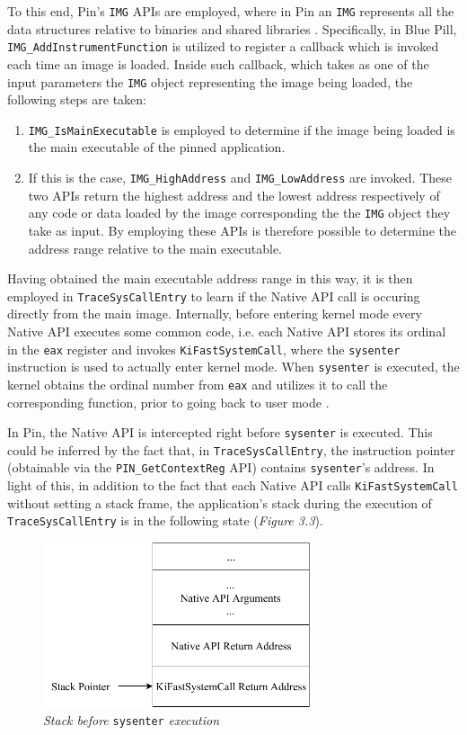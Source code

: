 To this end, Pin's \texttt{IMG} APIs are employed, where in Pin an \texttt{IMG} represents all the data structures relative to binaries and shared libraries \cite{Pin}. Specifically, in Blue Pill, \texttt{IMG\_AddInstrumentFunction} is utilized to register a callback which is invoked each time an image is loaded. Inside such callback, which takes as one of the input parameters the \texttt{IMG} object representing the image being loaded, the following steps are taken:
\begin{enumerate}
\item \texttt{IMG\_IsMainExecutable} is employed to determine if the image being loaded is the main executable of the pinned application.
\item If this is the case, \texttt{IMG\_HighAddress} and \texttt{IMG\_LowAddress} are invoked. These two APIs return the highest address and the lowest address respectively of any code or data loaded by the image corresponding the the \texttt{IMG} object they take as input. By employing these APIs is therefore possible to determine the address range relative to the main executable. 
\end{enumerate}  

Having obtained the main executable address range in this way, it is then employed in \texttt{TraceSysCallEntry} to learn if the Native API call is occuring directly from the main image. Internally, before entering kernel mode every Native API executes some common code, i.e. each Native API stores its ordinal in the \texttt{eax} register and invokes \texttt{KiFastSystemCall}, where the \texttt{sysenter} instruction is used to actually enter kernel mode. When \texttt{sysenter} is executed, the kernel obtains the ordinal number from \texttt{eax} and utilizes it to call the corresponding function, prior to going back to user mode \cite{MalwareTech}.

In Pin, the Native API is intercepted right before \texttt{sysenter} is executed. This could be inferred by the fact that, in \texttt{TraceSysCallEntry}, the instruction pointer (obtainable via the \texttt{PIN\_GetContextReg} API) contains \texttt{sysenter}'s address. In light of this, in addition to the fact that each Native API calls \texttt{KiFastSystemCall} without setting a stack frame, the application's stack during the execution of \texttt{TraceSysCallEntry} is in the following state (\textit{Figure 3.3}).
\\
\begin{figure}[h]
\centering
\includegraphics[width=0.7\textwidth]{Figures/StackMainImage.pdf}
\caption{\textit{Stack before} \texttt{sysenter} \textit{execution}}
\end{figure}     

